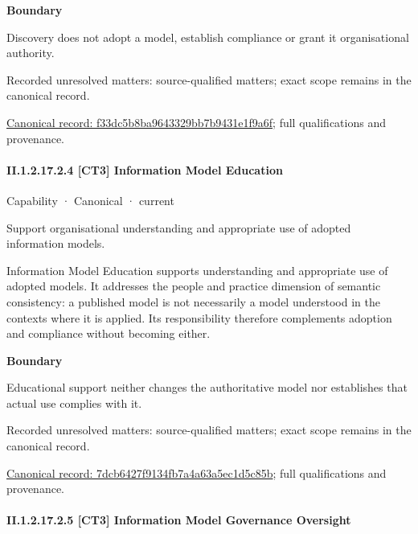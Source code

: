 \textbf{Boundary}



Discovery does not adopt a model, establish compliance or grant it organisational authority.


{\small Recorded unresolved matters: source-qualified matters; exact scope remains in the canonical record.}\par
{\footnotesize \href{../../../../continuum/strategy/capability/f33dc5b8ba9643329bb7b9431e1f9a6f.md}{Canonical record: f33dc5b8ba9643329bb7b9431e1f9a6f}; full qualifications and provenance.}\par
\paragraph*{II.1.2.17.2.4 [CT3] Information Model Education}
\label{navigation:II.1.2.17.2.4}

\label{element:7dcb6427f9134fb7a4a63a5ec1d5c85b}
{\small Capability · Canonical · current}\par

Support organisational understanding and appropriate use of adopted information models.



Information Model Education supports understanding and appropriate use of adopted models. It addresses the people and practice dimension of semantic consistency: a published model is not necessarily a model understood in the contexts where it is applied. Its responsibility therefore complements adoption and compliance without becoming either.



\textbf{Boundary}



Educational support neither changes the authoritative model nor establishes that actual use complies with it.


{\small Recorded unresolved matters: source-qualified matters; exact scope remains in the canonical record.}\par
{\footnotesize \href{../../../../continuum/strategy/capability/7dcb6427f9134fb7a4a63a5ec1d5c85b.md}{Canonical record: 7dcb6427f9134fb7a4a63a5ec1d5c85b}; full qualifications and provenance.}\par
\paragraph*{II.1.2.17.2.5 [CT3] Information Model Governance Oversight}
\label{navigation:II.1.2.17.2.5}


